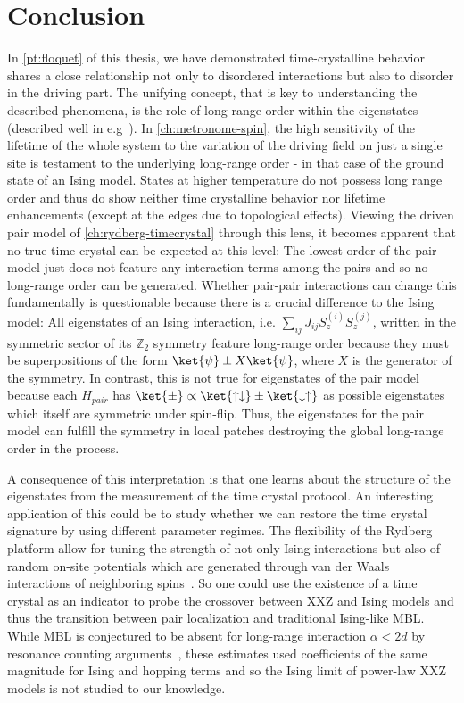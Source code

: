 \chapter{Conclusion}\label{ch:floquet-discussion}

In \autoref{pt:floquet} of this thesis, we have demonstrated time-crystalline behavior shares a close relationship not only to disordered interactions but also to disorder in the driving part. The unifying concept, that is key to understanding the described phenomena, is the role of long-range order within the eigenstates (described well in e.g~\cite{vonkeyserlingkAbsoluteStabilitySpatiotemporal2016,elsePrethermalPhasesMatter2017}). In \autoref{ch:metronome-spin}, the high sensitivity of the lifetime of the whole system to the variation of the driving field on just a single site is testament to the underlying long-range order - in that case of the ground state of an Ising model. States at higher temperature do not possess long range order and thus do show neither time crystalline behavior nor lifetime enhancements (except at the edges due to topological effects). Viewing the driven pair model of \autoref{ch:rydberg-timecrystal} through this lens, it becomes apparent that no true time crystal can be expected at this level: The lowest order of the pair model just does not feature any interaction terms among the pairs and so no long-range order can be generated. Whether pair-pair interactions can change this fundamentally is questionable because there is a crucial difference to the Ising model: All eigenstates of an Ising interaction, i.e. $\sum_{ij} J_{ij}S_{z}^{(i)}S_{z}^{(j)}$, written in the symmetric sector of its $\mathbb{Z}_2$ symmetry feature long-range order because they must be superpositions of the form $\ket{\psi}\pm X\ket{\psi}$, where $X$ is the generator of the symmetry. In contrast, this is not true for eigenstates of the pair model because each $H_{pair}$ has $\ket{\pm}\propto\ket{\uparrow\downarrow}\pm \ket{\downarrow\uparrow}$ as possible eigenstates which itself are symmetric under spin-flip. Thus, the eigenstates for the pair model can fulfill the symmetry in local patches destroying the global long-range order in the process.

A consequence of this interpretation is that one learns about the structure of the eigenstates from the measurement of the time crystal protocol. An interesting application of this could be to study whether we can restore the time crystal signature by using different parameter regimes. The flexibility of the Rydberg platform allow for tuning the strength of not only Ising interactions but also of random on-site potentials which are generated through van der Waals interactions of neighboring spins~\cite{wuProgrammableOrderDisorder2024}. So one could use the existence of a time crystal as an indicator to probe the crossover between XXZ and Ising models and thus the transition between pair localization and traditional Ising-like MBL. While MBL is conjectured to be absent for long-range interaction $\alpha < 2d$ by resonance counting arguments~\cite{yaoManyBodyLocalizationDipolar2014,burinLocalizationRandomXY2015}, these estimates used coefficients of the same magnitude for Ising and hopping terms and so the Ising limit of power-law XXZ models is not studied to our knowledge.